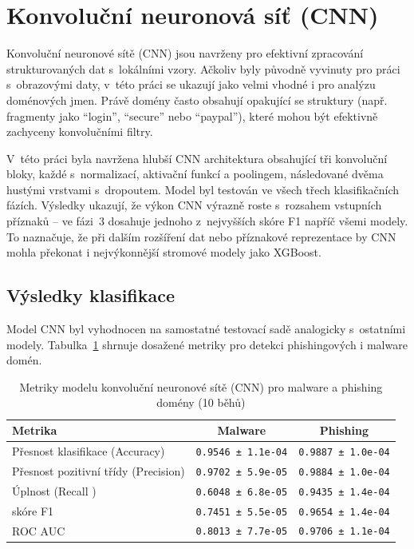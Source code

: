 \section{Konvoluční neuronová síť (CNN)}\label{res:cnn}

Konvoluční neuronové sítě (CNN) jsou navrženy pro efektivní zpracování strukturovaných dat s~lokálními vzory. Ačkoliv byly původně vyvinuty pro práci s~obrazovými daty, v~této práci se ukazují jako velmi vhodné i pro analýzu doménových jmen. Právě domény často obsahují opakující se struktury (např. fragmenty jako ``login'', ``secure'' nebo ``paypal''), které mohou být efektivně zachyceny konvolučními filtry.

V~této práci byla navržena hlubší CNN architektura obsahující tři konvoluční bloky, každé s~normalizací, aktivační funkcí a poolingem, následované dvěma hustými vrstvami s~dropoutem. Model byl testován ve všech třech klasifikačních fázích. Výsledky ukazují, že výkon CNN výrazně roste s~rozsahem vstupních příznaků – ve fázi~3 dosahuje jednoho z~nejvyšších skóre F1 napříč všemi modely. To naznačuje, že při dalším rozšíření dat nebo příznakové reprezentace by CNN mohla překonat i nejvýkonnější stromové modely jako XGBoost.

\subsection{Výsledky klasifikace}

Model CNN byl vyhodnocen na samostatné testovací sadě analogicky s~ostatními modely. Tabulka~\ref{tab:cnn_malware_phishing_results} shrnuje dosažené metriky pro detekci phishingových i malware domén.

\begin{table}[H]
\centering
\begin{tabular}{|l|c|c|}
\hline
\textbf{Metrika} & \textbf{Malware} & \textbf{Phishing} \\
\hline
Přesnost klasifikace (Accuracy)        & \texttt{0.9546 ± 1.1e-04} & \texttt{0.9887 ± 1.0e-04} \\
Přesnost pozitivní třídy (Precision)       & \texttt{0.9702 ± 5.9e-05} & \texttt{0.9884 ± 1.0e-04} \\
Úplnost (Recall )           & \texttt{0.6048 ± 6.8e-05} & \texttt{0.9435 ± 1.4e-04} \\
skóre F1                   & \texttt{0.7451 ± 5.5e-05} & \texttt{0.9654 ± 1.4e-04} \\
ROC AUC                    & \texttt{0.8013 ± 7.7e-05} & \texttt{0.9706 ± 1.1e-04} \\
\hline
\end{tabular}
\caption{Metriky modelu konvoluční neuronové sítě (CNN) pro malware a phishing domény (10 běhů)}
\label{tab:cnn_malware_phishing_results}
\end{table}

